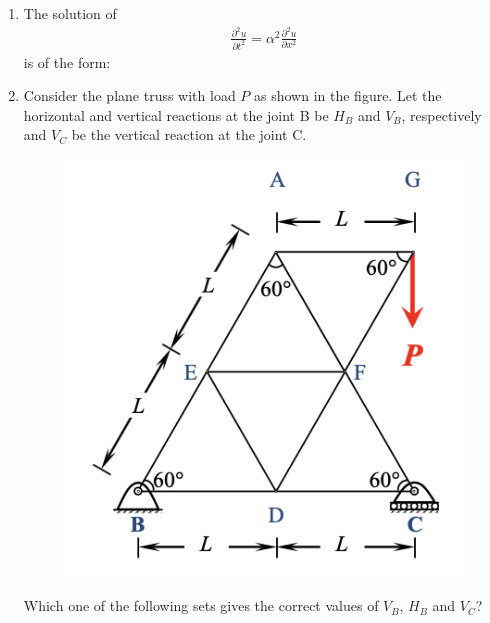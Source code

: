 \documentclass[journal]{IEEEtran}
\begin{document}
\begin{enumerate}[resume]
\item The solution of
\begin{align}
\frac{\partial^2 u}{\partial t^2} = \alpha^2 \frac{\partial^2 u}{\partial x^2}
\end{align}
is of the form: \hfill {}
\begin{enumerate}
\end{enumerate}
\maketitle

\item Consider the plane truss with load $P$ as shown in the figure. Let the horizontal and vertical reactions at the joint B be $H_B$ and $V_B$, respectively and $V_C$ be the vertical reaction at the joint C.

\begin{figure}[H]
    \centering
    \includegraphics[width=0.6\columnwidth]{figs/Q16.png} 
    \caption{}
    \label{fig:placeholder}
\end{figure}

Which one of the following sets gives the correct values of $V_B$, $H_B$ and $V_C$? \hfill {}
\begin{enumerate}
\end{enumerate}



\end{enumerate}
\end{document}
